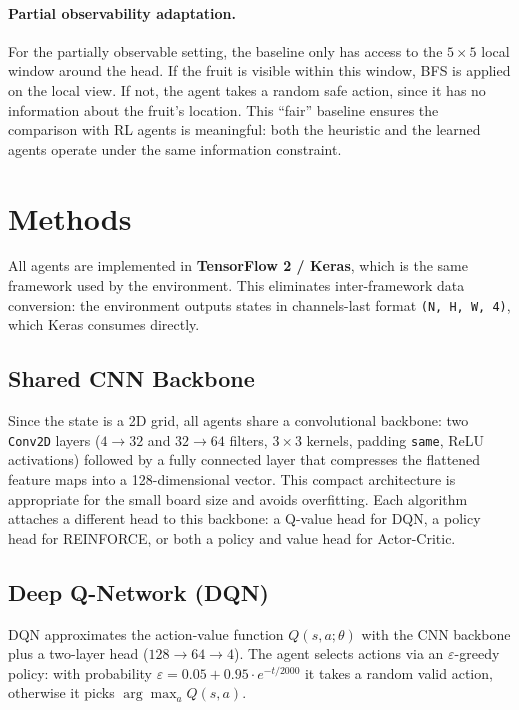 \documentclass[11pt, a4paper]{article}
\begin{document}
\paragraph{Partial observability adaptation.}
For the partially observable setting, the baseline only has access to the $5 \times 5$ local
window around the head. If the fruit is visible within this window, BFS is applied on the local
view. If not, the agent takes a random safe action, since it has no information about the
fruit's location. This ``fair'' baseline ensures the comparison with RL agents is meaningful:
both the heuristic and the learned agents operate under the same information constraint.

\section{Methods}

All agents are implemented in \textbf{TensorFlow 2 / Keras}, which is the same framework used
by the environment. This eliminates inter-framework data conversion: the environment outputs
states in channels-last format \texttt{(N, H, W, 4)}, which Keras consumes directly.

\subsection{Shared CNN Backbone}

Since the state is a 2D grid, all agents share a convolutional backbone:
two \texttt{Conv2D} layers ($4 {\to} 32$ and $32 {\to} 64$ filters, $3 {\times} 3$ kernels,
padding \texttt{same}, ReLU activations) followed by a fully connected layer that compresses
the flattened feature maps into a 128-dimensional vector. This compact architecture is
appropriate for the small board size and avoids overfitting. Each algorithm attaches a different
head to this backbone: a Q-value head for DQN, a policy head for REINFORCE, or both a policy
and value head for Actor-Critic.

\subsection{Deep Q-Network (DQN)}

DQN approximates the action-value function $Q(s, a; \theta)$ with the CNN backbone plus a
two-layer head ($128 {\to} 64 {\to} 4$). The agent selects actions via an
$\varepsilon$-greedy policy: with probability
$\varepsilon = 0.05 + 0.95 \cdot e^{-t / 2000}$ it takes a random valid action, otherwise it
picks $\arg\max_a Q(s, a)$.
\end{document}
